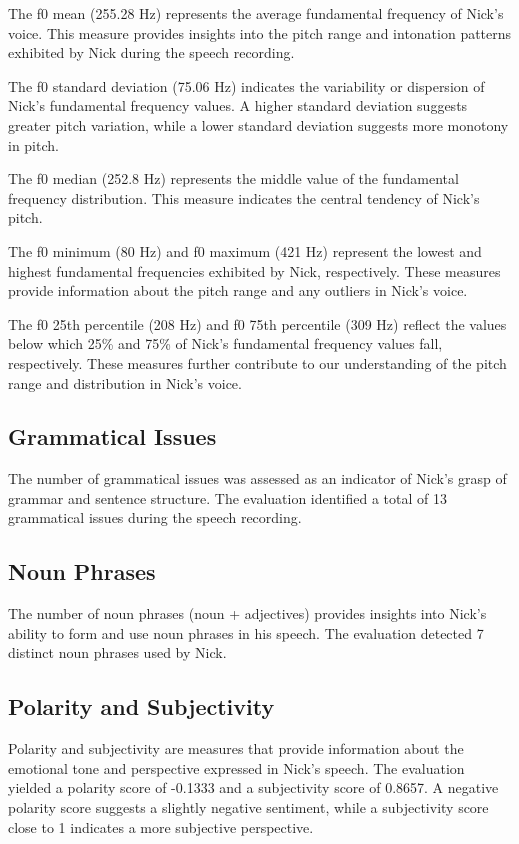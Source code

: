 \documentclass{article}
\begin{document}
The f0 mean (255.28 Hz) represents the average fundamental frequency of Nick's voice. This measure provides insights into the pitch range and intonation patterns exhibited by Nick during the speech recording.

The f0 standard deviation (75.06 Hz) indicates the variability or dispersion of Nick's fundamental frequency values. A higher standard deviation suggests greater pitch variation, while a lower standard deviation suggests more monotony in pitch.

The f0 median (252.8 Hz) represents the middle value of the fundamental frequency distribution. This measure indicates the central tendency of Nick's pitch.

The f0 minimum (80 Hz) and f0 maximum (421 Hz) represent the lowest and highest fundamental frequencies exhibited by Nick, respectively. These measures provide information about the pitch range and any outliers in Nick's voice.

The f0 25th percentile (208 Hz) and f0 75th percentile (309 Hz) reflect the values below which 25\% and 75\% of Nick's fundamental frequency values fall, respectively. These measures further contribute to our understanding of the pitch range and distribution in Nick's voice.

\subsection{Grammatical Issues}

The number of grammatical issues was assessed as an indicator of Nick's grasp of grammar and sentence structure. The evaluation identified a total of 13 grammatical issues during the speech recording.

\subsection{Noun Phrases}

The number of noun phrases (noun + adjectives) provides insights into Nick's ability to form and use noun phrases in his speech. The evaluation detected 7 distinct noun phrases used by Nick.

\subsection{Polarity and Subjectivity}

Polarity and subjectivity are measures that provide information about the emotional tone and perspective expressed in Nick's speech. The evaluation yielded a polarity score of -0.1333 and a subjectivity score of 0.8657. A negative polarity score suggests a slightly negative sentiment, while a subjectivity score close to 1 indicates a more subjective perspective.
\end{document}
